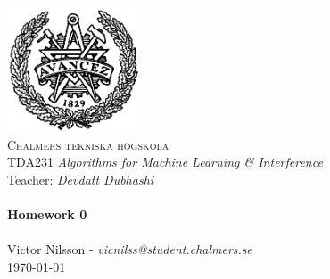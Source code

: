 
\begin{titlepage}
\begin{center}


~\\[1.0cm]
 \includegraphics[width=0.3\textwidth]{chalmers.png}~\\[1.0cm]

\textsc{\LARGE Chalmers tekniska högskola}\\[0.3cm]
TDA231 \textit{Algorithms for Machine Learning \& Interference}\\
Teacher: \textit{Devdatt Dubhashi} \\

\HRule \\[0.3cm]
{ \huge \bfseries Homework 0 \\[0.3cm] }
\HRule \\[0.3cm]

Victor Nilsson  -  \textit{vicnilss@student.chalmers.se}\\ [0.3cm]


\vfill
{\large \today}

\end{center}
\end{titlepage}

\newpage
